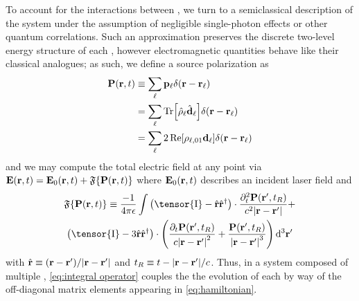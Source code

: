 To account for the interactions between \qds{}, we turn to a semiclassical description of the system under the assumption of negligible single-photon effects or other quantum correlations.
Such an approximation preserves the discrete two-level energy structure of each \qd{}, however electromagnetic quantities behave like their classical analogues;
as such, we define a source polarization as
\begin{equation}
  \begin{aligned}
    \vb{P}(\vb{r}, t) &\equiv \sum_\ell \vb{p}_\ell \delta(\vb{r} - \vb{r}_\ell) \\
                      &= \sum_\ell \Tr[\hat{\rho}_\ell \hat{\vb{d}}_\ell] \delta(\vb{r} - \vb{r}_\ell) \\
                      &= \sum_\ell 2 \Re[\rho_{\ell,01}\vb{d}_\ell]\delta(\vb{r} - \vb{r}_\ell) \\
  \end{aligned}
\end{equation}
and we may compute the total electric field at any point via $\vb{E}(\vb{r}, t) = \vb{E}_0(\vb{r}, t) + \mathfrak{F}\{ \vb{P}(\vb{r}, t) \}$
where $\vb{E}_0(\vb{r}, t)$ describes an incident laser field and
\begin{equation}
  \begin{gathered}
    \mathfrak{F}\{\vb{P}(\vb{r}, t)\} \equiv
      \frac{-1}{4\pi \epsilon} \int
      \left(\tensor{\mathrm{I}} -  \hat{\mathbf{r}}\hat{\mathbf{r}}^\dagger\right) \cdot \frac{\partial_t^2 \mathbf{P}(\mathbf{r}', t_R)}{c^2 \abs{\mathbf{r}-\mathbf{r}'}} + \\
      \left(\tensor{\mathrm{I}} - 3\hat{\mathbf{r}}\hat{\mathbf{r}}^\dagger\right) \cdot \qty(
        \frac{\partial_t   \mathbf{P}(\mathbf{r}', t_R)}{c \abs{\mathbf{r}-\mathbf{r}'}^2} +
        \frac{             \mathbf{P}(\mathbf{r}', t_R)}{  \abs{\mathbf{r}-\mathbf{r}'}^3}
      )
    \, \mathrm{d}^3 \mathbf{r'}
  \end{gathered}
  \label{eq:integral operator}
\end{equation}
with $\hat{\vb{r}} \equiv \qty(\vb{r} - \vb{r}')/\abs{\vb{r} - \vb{r}'}$ and $t_R \equiv t - \abs{\vb{r} - \vb{r}'}/c$.
Thus, in a system composed of multiple \qds{}, \cref{eq:integral operator} couples the the evolution of each \qd{} by way of the off-diagonal matrix elements appearing in \cref{eq:hamiltonian}.
